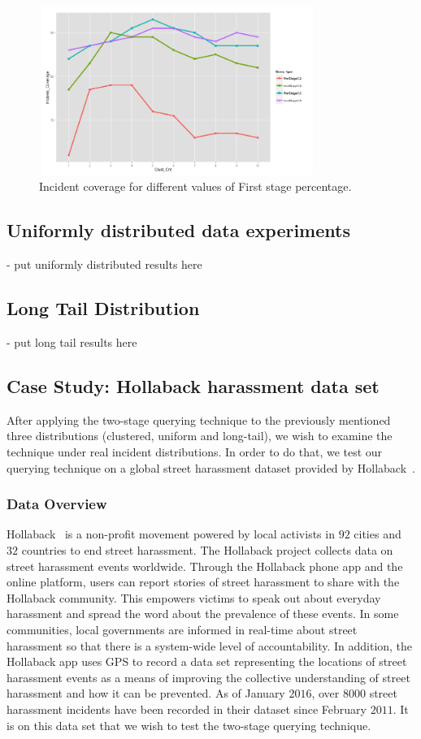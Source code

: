 \documentclass{acm_proc_article-sp}
\begin{document}
\begin{figure}[!h]
\centering
   \includegraphics[width=9cm ,height=5.5cm]{figuresPng/Coverage_Result.png}
   \caption{Incident coverage for different values of First stage percentage. }
   \label{fig: clustCoverage}
\end{figure}



\subsection{Uniformly distributed data experiments}
- put uniformly distributed results here


\subsection{Long Tail Distribution}
- put long tail results here

\subsection{Case Study: Hollaback harassment data set}
After applying the two-stage querying technique to the previously mentioned three distributions (clustered, uniform and long-tail), we wish to examine the technique under real incident distributions. In order to do that, we test our querying technique on a global street harassment dataset provided by Hollaback~\cite{hollaback}.

\subsubsection{Data Overview}
Hollaback~\cite{hollaback} is a non-profit movement powered by local activists in $92$ cities and $32$ countries to end street harassment. The Hollaback project collects data on street harassment events worldwide. Through the Hollaback phone app and the online platform, users can report stories of street harassment to share with the Hollaback community. This empowers victims to speak out about everyday harassment and spread the word about the prevalence of these events. In some communities, local governments are informed in real-time about street harassment so that there is a system-wide level of accountability. In addition, the Hollaback app uses GPS to record a data set representing the locations of street harassment events as a means of improving the collective understanding of street harassment and how it can be prevented.  As of January $2016$, over $8000$ street harassment incidents have been recorded in their dataset since February $2011$.  It is on this data set that we wish to test the two-stage querying technique.\par
\end{document}
